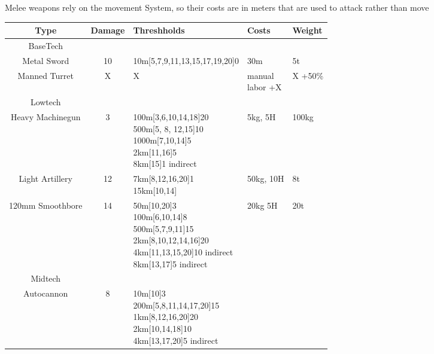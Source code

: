 Melee weapons rely on the movement System, so their costs are in meters that are used to attack rather than move\par
\begin{tabular}{c|clll}
    Type & Damage & Threshholds & Costs & Weight\\
    \hline BaseTech&&&&\\
    Metal Sword & 10 & 10m[5,7,9,11,13,15,17,19,20]0 & 30m & 5t \\
    Manned Turret & X & X & \makecell[l]{manual \\labor +X} &  X +50\% \\
    \hline Lowtech &&&&\\
    Heavy Machinegun & 3 & \makecell[l]{100m[3,6,10,14,18]20\\
                                        500m[5, 8, 12,15]10\\
                                        1000m[7,10,14]5\\
                                        2km[11,16]5\\
                                        8km[15]1 indirect}
                                            & 5kg, 5H & 100kg \\
    Light Artillery & 12 & \makecell[l]{7km[8,12,16,20]1 \\
                                        15km[10,14]}& 50kg, 10H & 8t  \\
    120mm Smoothbore & 14 & \makecell[l]{50m[10,20]3\\
                                        100m[6,10,14]8\\
                                        500m[5,7,9,11]15\\
                                        2km[8,10,12,14,16]20\\
                                        4km[11,13,15,20]10 indirect\\
                                        8km[13,17]5 indirect}
                                            & 20kg 5H & 20t \\
    \hline Midtech &&&&\\
    Autocannon & 8 & \makecell[l]{10m[10]3\\
                                  200m[5,8,11,14,17,20]15\\
                                  1km[8,12,16,20]20\\
                                  2km[10,14,18]10 \\
                                  4km[13,17,20]5 indirect }

\end{tabular}

